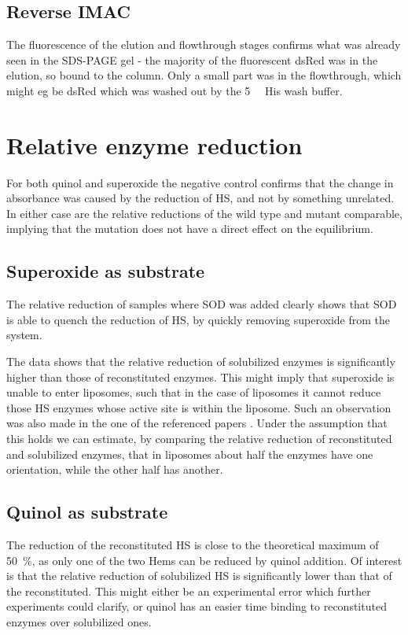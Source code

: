 \subsection{Reverse IMAC}

The fluorescence of the elution and flowthrough stages confirms what was
already seen in the SDS-PAGE gel - the majority of the fluorescent dsRed was
in the elution, so bound to the column. Only a small part was in the
flowthrough, which might eg be dsRed which was washed out by the
\SI{5}{\milli\Molar} His wash buffer.

\section{Relative enzyme reduction}

For both quinol and superoxide the negative control confirms that the change in
absorbance was caused by the reduction of HS, and not by something unrelated.
In either case are the relative reductions of the wild type and mutant
comparable, implying that the mutation does not have a direct effect on the
equilibrium.

\subsection{Superoxide as substrate}

The relative reduction of samples where SOD was added clearly shows that SOD is
able to quench the reduction of HS, by quickly removing superoxide from the
system.

The data shows that the relative reduction of solubilized enzymes is
significantly higher than those of reconstituted enzymes. This might imply that
superoxide is unable to enter liposomes, such that in the case of liposomes it
cannot reduce those HS enzymes whose active site is within the liposome. Such
an observation was also made in the one of the referenced papers \cite{soo}.
Under the assumption that this holds we can estimate, by comparing the relative
reduction of reconstituted and solubilized enzymes, that in liposomes about
half the enzymes have one orientation, while the other half has another.

\subsection{Quinol as substrate}

The reduction of the reconstituted HS is close to the theoretical maximum of
\SI{50}{\percent}, as only one of the two Hems can be reduced by quinol
addition. Of interest is that the relative reduction of solubilized HS is
significantly lower than that of the reconstituted. This might either be an
experimental error which further experiments could clarify, or quinol has an
easier time binding to reconstituted enzymes over solubilized ones.

